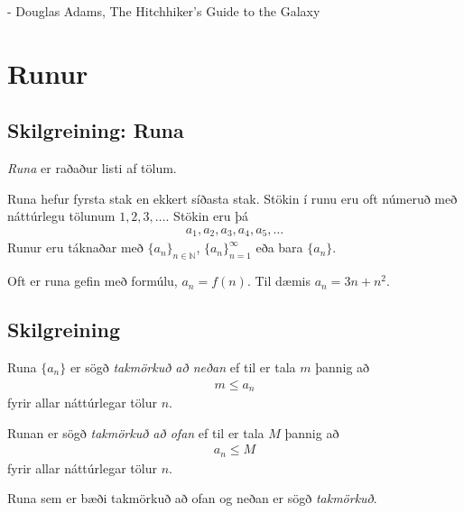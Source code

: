 \documentclass[a4paper,10pt,icelandic]{sphinxmanual}
\begin{document}
- Douglas Adams, The Hitchhiker's Guide to the Galaxy


\section{Runur}
\label{kafli09:index-0}\label{kafli09:runur}

\subsection{Skilgreining: Runa}
\label{kafli09:skilgreining-runa}
\emph{Runa} er raðaður listi af tölum.

Runa hefur fyrsta stak en ekkert síðasta stak. Stökin í runu eru oft
númeruð með náttúrlegu tölunum \(1, 2, 3, \ldots\). Stökin eru þá
\begin{equation*}
\begin{split}a_1, a_2, a_3, a_4, a_5, \ldots\end{split}
\end{equation*}
Runur eru táknaðar með \(\{a_n\}_{n\in {{{\mathbb  N}}}}\),
\(\{a_n\}_{n=1}^\infty\) eða bara \(\{a_n\}\).

Oft er runa gefin með formúlu, \(a_n = f(n)\). Til dæmis
\(a_n = 3n + n^2\).


\subsection{Skilgreining}
\label{kafli09:skilgreining}\label{kafli09:index-1}
Runa \(\{a_n\}\) er sögð \emph{takmörkuð að neðan} ef til er tala
\(m\) þannig að
\begin{equation*}
\begin{split}m\leq a_n\end{split}
\end{equation*}
fyrir allar náttúrlegar tölur \(n\).

Runan er sögð \emph{takmörkuð að ofan} ef til er tala \(M\) þannig að
\begin{equation*}
\begin{split}a_n\leq M\end{split}
\end{equation*}
fyrir allar náttúrlegar tölur \(n\).

Runa sem er bæði takmörkuð að ofan og neðan er sögð \emph{takmörkuð}.

\end{document}
